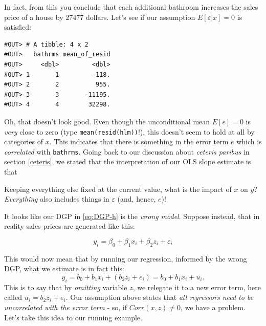 \documentclass[]{book}
\newenvironment{Shaded}{\begin{snugshade}}{\end{snugshade}}
\newcommand{\CommentTok}[1]{\textcolor[rgb]{0.56,0.35,0.01}{\textit{#1}}}
\newcommand{\DataTypeTok}[1]{\textcolor[rgb]{0.13,0.29,0.53}{#1}}
\newcommand{\KeywordTok}[1]{\textcolor[rgb]{0.13,0.29,0.53}{\textbf{#1}}}
\newcommand{\NormalTok}[1]{#1}
\newcommand{\OperatorTok}[1]{\textcolor[rgb]{0.81,0.36,0.00}{\textbf{#1}}}
\newcommand{\StringTok}[1]{\textcolor[rgb]{0.31,0.60,0.02}{#1}}
\newenvironment{tip}{\begin{tcolorbox}[colback=green!5!white,colframe=green]}{\end{tcolorbox}}
\begin{document}
In fact, from this you conclude that each additional bathroom increases the sales price of a house by 27477 dollars. Let's see if our assumption \(E[\varepsilon|x] = 0\) is satisfied:

\begin{Shaded}
\end{Shaded}

\begin{verbatim}
#OUT> # A tibble: 4 x 2
#OUT>   bathrms mean_of_resid
#OUT>     <dbl>         <dbl>
#OUT> 1       1         -118.
#OUT> 2       2          955.
#OUT> 3       3       -11195.
#OUT> 4       4        32298.
\end{verbatim}

Oh, that doesn't look good. Even though the unconditional mean \(E[e] = 0\) is \emph{very} close to zero (type \texttt{mean(resid(hlm))}!), this doesn't seem to hold at all by categories of \(x\). This indicates that there is something in the error term \(e\) which is \emph{correlated} with \texttt{bathrms}. Going back to our discussion about \emph{ceteris paribus} in section \ref{ceteris}, we stated that the interpretation of our OLS slope estimate is that

\begin{tip}
Keeping everything else fixed at the current value, what is the impact
of \(x\) on \(y\)? \emph{Everything} also includes things in
\(\varepsilon\) (and, hence, \(e\))!
\end{tip}

It looks like our DGP in \eqref{eq:DGP-h} is the \emph{wrong model}. Suppose instead, that in reality sales prices are generated like this:

\begin{equation}
y_i = \beta_0 + \beta_1 x_i + \beta_2 z_i + \varepsilon_i \label{eq:DGP-h2}
\end{equation}

This would now mean that by running our regression, informed by the wrong DGP, what we estimate is in fact this:
\[
y_i = b_0 + b_1 x_i + (b_2 z_i + e_i)  = b_0 + b_1 x_i + u_i.
\]
This is to say that by \emph{omitting} variable \(z\), we relegate it to a new error term, here called \(u_i = b_2 z_i + e_i\). Our assumption above states that \emph{all regressors need to be uncorrelated with the error term} - so, if \(Corr(x,z)\neq 0\), we have a problem. Let's take this idea to our running example.
\end{document}
